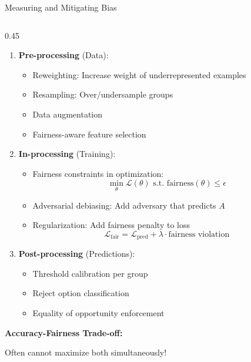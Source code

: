 \begin{frame}[fragile]{Measuring and Mitigating Bias}
\begin{columns}
\begin{column}{0.45\textwidth}
\begin{enumerate}
\item \textbf{Pre-processing} (Data):
   \begin{itemize}
   \item Reweighting: Increase weight of underrepresented examples
   \item Resampling: Over/undersample groups
   \item Data augmentation
   \item Fairness-aware feature selection
   \end{itemize}

\item \textbf{In-processing} (Training):
   \begin{itemize}
   \item Fairness constraints in optimization:
   \[\min_\theta \mathcal{L}(\theta) \text{ s.t. fairness}(\theta) \leq \epsilon\]
   \item Adversarial debiasing: Add adversary that predicts $A$
   \item Regularization: Add fairness penalty to loss
   \[\mathcal{L}_{\text{fair}} = \mathcal{L}_{\text{pred}} + \lambda \cdot \text{fairness violation}\]
   \end{itemize}

\item \textbf{Post-processing} (Predictions):
   \begin{itemize}
   \item Threshold calibration per group
   \item Reject option classification
   \item Equality of opportunity enforcement
   \end{itemize}
\end{enumerate}

\vspace{0.3cm}
\textbf{Accuracy-Fairness Trade-off:}

\begin{figure}
\centering
{}
\end{figure}

Often cannot maximize both simultaneously!
\end{column}
\end{columns}
\end{frame}

